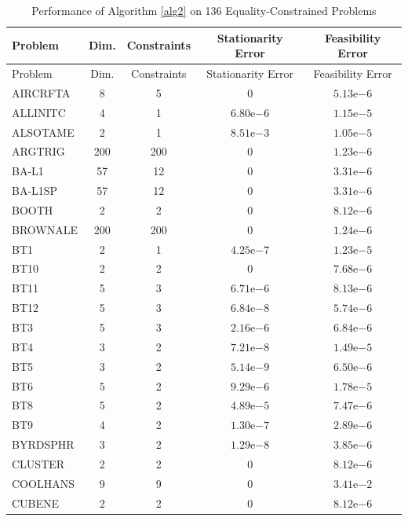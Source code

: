 \documentclass[11pt]{article}
\begin{document}
\begin{center}
\scriptsize
\begin{longtable}{lcccc}
\caption{Performance of Algorithm \ref{alg2} on 136 Equality-Constrained Problems} \\
\toprule
Problem & Dim. & Constraints & Stationarity Error & Feasibility Error \\
\midrule
\endfirsthead
\toprule
Problem & Dim. & Constraints & Stationarity Error & Feasibility Error \\
\midrule
\endhead
\bottomrule
\endfoot
AIRCRFTA & 8 & 5 & $0$ & $5.13\mathrm{e}{-6}$\\
ALLINITC & 4 & 1 & $6.80\mathrm{e}{-6}$ & $1.15\mathrm{e}{-5}$\\
ALSOTAME & 2 & 1 & $8.51\mathrm{e}{-3}$ & $1.05\mathrm{e}{-5}$\\
ARGTRIG & 200 & 200 & $0$ & $1.23\mathrm{e}{-6}$\\
BA-L1 & 57 & 12 & $0$ & $3.31\mathrm{e}{-6}$\\
BA-L1SP & 57 & 12 & $0$ & $3.31\mathrm{e}{-6}$\\
BOOTH & 2 & 2 & $0$ & $8.12\mathrm{e}{-6}$\\
BROWNALE & 200 & 200 & $0$ & $1.24\mathrm{e}{-6}$\\
BT1 & 2 & 1 & $4.25\mathrm{e}{-7}$ & $1.23\mathrm{e}{-5}$\\
BT10 & 2 & 2 & $0$ & $7.68\mathrm{e}{-6}$\\
BT11 & 5 & 3 & $6.71\mathrm{e}{-6}$ & $8.13\mathrm{e}{-6}$\\
BT12 & 5 & 3 & $6.84\mathrm{e}{-8}$ & $5.74\mathrm{e}{-6}$\\
BT3 & 5 & 3 & $2.16\mathrm{e}{-6}$ & $6.84\mathrm{e}{-6}$\\
BT4 & 3 & 2 & $7.21\mathrm{e}{-8}$ & $1.49\mathrm{e}{-5}$\\
BT5 & 3 & 2 & $5.14\mathrm{e}{-9}$ & $6.50\mathrm{e}{-6}$\\
BT6 & 5 & 2 & $9.29\mathrm{e}{-6}$ & $1.78\mathrm{e}{-5}$\\
BT8 & 5 & 2 & $4.89\mathrm{e}{-5}$ & $7.47\mathrm{e}{-6}$\\
BT9 & 4 & 2 & $1.30\mathrm{e}{-7}$ & $2.89\mathrm{e}{-6}$\\
BYRDSPHR & 3 & 2 & $1.29\mathrm{e}{-8}$ & $3.85\mathrm{e}{-6}$\\
CLUSTER & 2 & 2 & $0$ & $8.12\mathrm{e}{-6}$\\
COOLHANS & 9 & 9 & $0$ & $3.41\mathrm{e}{-2}$\\
CUBENE & 2 & 2 & $0$ & $8.12\mathrm{e}{-6}$\\

\end{longtable}
\end{center}
\end{document}

